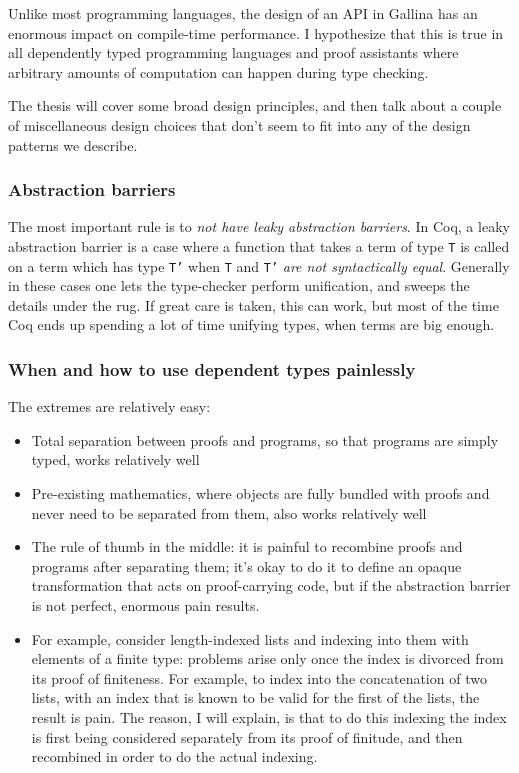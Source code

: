 \documentclass[twoside]{article}
\begin{document}
Unlike most programming languages, the design of an API in Gallina has an enormous impact on compile-time performance.
I hypothesize that this is true in all dependently typed programming languages and proof assistants where arbitrary amounts of computation can happen during type checking.

The thesis will cover some broad design principles, and then talk about a couple of miscellaneous design choices that don't seem to fit into any of the design patterns we describe.

\subsubsection{Abstraction barriers}
The most important rule is to \emph{not have leaky abstraction barriers}.
In Coq, a leaky abstraction barrier is a case where a function that takes a term of type \texttt{T} is called on a term which has type \texttt{T'} when \texttt{T} and \texttt{T'} \emph{are not syntactically equal}.
Generally in these cases one lets the type-checker perform unification, and sweeps the details under the rug.
If great care is taken, this can work, but most of the time Coq ends up spending a lot of time unifying types, when terms are big enough.

\subsubsection{When and how to use dependent types painlessly}
The extremes are relatively easy:
\begin{itemize}
\item Total separation between proofs and programs, so that programs are simply typed, works relatively well
\item Pre-existing mathematics, where objects are fully bundled with proofs and never need to be separated from them, also works relatively well
\item The rule of thumb in the middle: it is painful to recombine proofs and programs after separating them; it's okay to do it to define an opaque transformation that acts on proof-carrying code, but if the abstraction barrier is not perfect, enormous pain results.
\item For example, consider length-indexed lists and indexing into them with elements of a finite type: problems arise only once the index is divorced from its proof of finiteness.  For example, to index into the concatenation of two lists, with an index that is known to be valid for the first of the lists, the result is pain.  The reason, I will explain, is that to do this indexing the index is first being considered separately from its proof of finitude, and then recombined in order to do the actual indexing.
\end{itemize}
\end{document}
